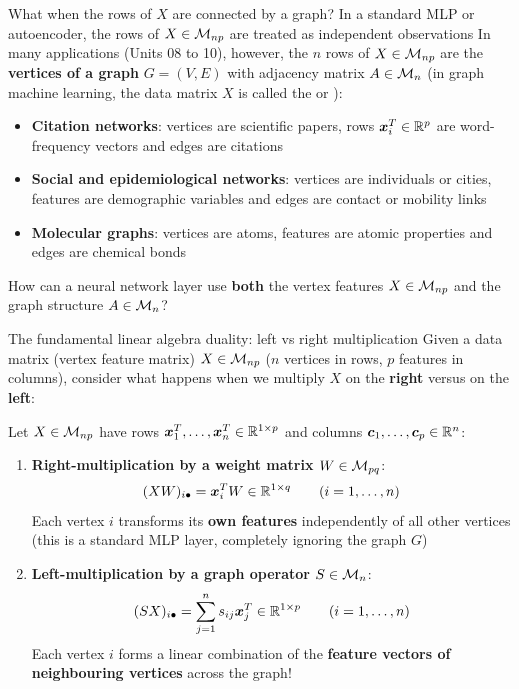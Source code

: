 \documentclass[aspectratio=169]{beamer}\usepackage[]{graphicx}\usepackage[]{xcolor}
\begin{document}
\begin{frame}{What when the rows of $X$ are connected by a graph?}
In a standard MLP or autoencoder, the rows of $X \in \mathcal{M}_{np}$ are treated as independent observations
\vfill
In many applications (Units 08 to 10), however, the $n$ rows of $X \in \mathcal{M}_{np}$ are the \textbf{vertices of a graph} $G = (V, E)$ with adjacency matrix $A \in \mathcal{M}_n$ (in graph machine learning, the data matrix $X$ is called the  or ):
\begin{itemize}
\item \textbf{Citation networks}: vertices are scientific papers, rows $\bm{x}_i^T \in \mathbb{R}^p$ are word-frequency vectors and edges are citations
\item \textbf{Social and epidemiological networks}: vertices are individuals or cities, features are demographic variables and edges are contact or mobility links
\item \textbf{Molecular graphs}: vertices are atoms, features are atomic properties and edges are chemical bonds
\end{itemize}
\vfill
How can a neural network layer use \textbf{both} the vertex features $X \in \mathcal{M}_{np}$ and the graph structure $A \in \mathcal{M}_n$?
\end{frame}


\begin{frame}{The fundamental linear algebra duality: left vs right multiplication}
Given a data matrix (vertex feature matrix) $X \in \mathcal{M}_{np}$ ($n$ vertices in rows, $p$ features in columns), consider what happens when we multiply $X$ on the \textbf{right} versus on the \textbf{left}:
\vfill
\begin{importantproperty}
\label{prop:left-vs-right}
Let $X \in \mathcal{M}_{np}$ have rows $\bm{x}_1^T, \ldots, \bm{x}_n^T \in \mathbb{R}^{1 \times p}$ and columns $\bm{c}_1, \ldots, \bm{c}_p \in \mathbb{R}^n$:
\begin{enumerate}
\item \textbf{Right-multiplication by a weight matrix $W \in \mathcal{M}_{pq}$}:
\[
(XW)_{i\bullet} = \bm{x}_i^T W \in \mathbb{R}^{1 \times q} \qquad (i = 1, \ldots, n)
\]
Each vertex $i$ transforms its \textbf{own features} independently of all other vertices (this is a standard MLP layer, completely ignoring the graph $G$)
\item \textbf{Left-multiplication by a graph operator $S \in \mathcal{M}_n$}:
\[
(SX)_{i\bullet} = \sum_{j=1}^n s_{ij} \bm{x}_j^T \in \mathbb{R}^{1 \times p} \qquad (i = 1, \ldots, n)
\]
Each vertex $i$ forms a linear combination of the \textbf{feature vectors of neighbouring vertices} across the graph!
\end{enumerate}
\end{importantproperty}
\end{frame}
\end{document}
